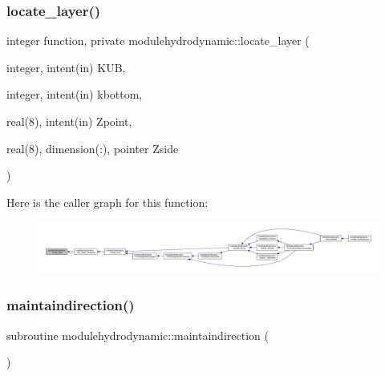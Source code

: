 \subsubsection{\texorpdfstring{locate\+\_\+layer()}{locate\_layer()}}
{\footnotesize\ttfamily integer function, private modulehydrodynamic\+::locate\+\_\+layer (\begin{DoxyParamCaption}\item[{integer, intent(in)}]{K\+UB,  }\item[{integer, intent(in)}]{kbottom,  }\item[{real(8), intent(in)}]{Zpoint,  }\item[{real(8), dimension(\+:), pointer}]{Zside }\end{DoxyParamCaption})\hspace{0.3cm}{\ttfamily [private]}}

Here is the caller graph for this function\+:\nopagebreak
\begin{figure}[H]
\begin{center}
\leavevmode
\includegraphics[width=350pt]{namespacemodulehydrodynamic_a24a4da561094133e0ef8f2a5d350d8ac_icgraph}
\end{center}
\end{figure}
\mbox{\label{namespacemodulehydrodynamic_a178f5e060ebc6d1ddcb0e70a9c9e95c2}} 
\subsubsection{\texorpdfstring{maintaindirection()}{maintaindirection()}}
{\footnotesize\ttfamily subroutine modulehydrodynamic\+::maintaindirection (\begin{DoxyParamCaption}{ }\end{DoxyParamCaption})\hspace{0.3cm}{\ttfamily [private]}}

